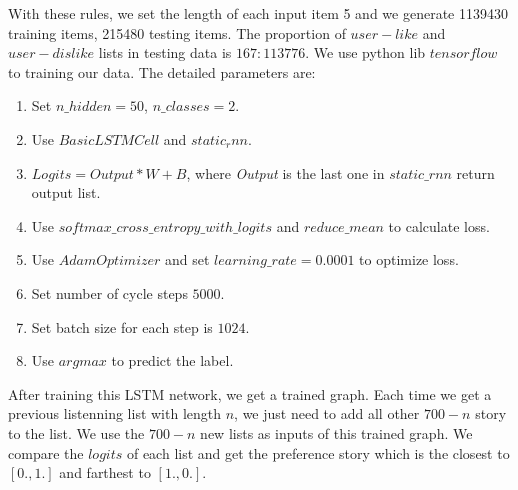 \documentclass[sigconf]{acmart}
\begin{document}
With these rules, we set the length of each input item 5 and we generate 1139430 training items, 215480 testing items. The proportion of $user-like$ and $user-dislike$ lists in testing data is $167:113776$.
We use python lib $tensorflow$ to training our data. The detailed parameters are:
\begin{enumerate}
\item Set $n\_hidden = 50$, $n\_classes = 2$.
\item Use $BasicLSTMCell$ and $static_rnn$.
\item $Logits = Output * W + B$, where \emph{Output} is the last one in $static\_rnn$ return output list.
\item Use $softmax\_cross\_entropy\_with\_logits$ and $reduce\_mean$ to calculate loss.
\item Use $AdamOptimizer$ and set $learning\_rate = 0.0001$ to optimize loss.
\item Set number of cycle steps $5000$.
\item Set batch size for each step is $1024$.
\item Use $argmax$ to predict the label.
\end{enumerate}
After training this LSTM network, we get a trained graph. Each time we get a previous listenning list with length $n$, we just need to add all other $700-n$ story to the list. We use the $700-n$ new lists as inputs of this trained graph. We compare the $logits$ of each list and get the preference story which is the closest to $[0., 1.]$ and farthest to $[1., 0.]$.
\end{document}
